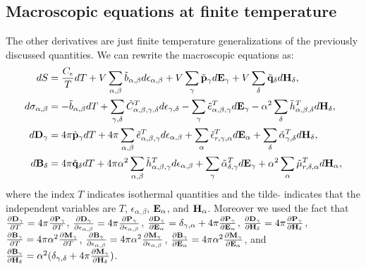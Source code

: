 \documentclass[12pt,a4paper]{article}
\begin{document}
{\subsection{\color{web-blue}Macroscopic equations at finite temperature}
The other derivatives are just finite temperature generalizations of the
previously discussed quantities. We can rewrite the macroscopic equations as:
\begin{align}
dS&= {C_\epsilon\over T} dT+ V \sum_{\alpha,\beta} \tilde b_{\alpha,\beta} 
d\epsilon_{\alpha,\beta}
+ V \sum_\gamma \tilde {\bf p}_\gamma d{\bf E}_{\gamma} + 
V \sum_\delta \tilde {\bf q}_\delta d{\bf H}_{\delta}, \\
d\sigma_{\alpha,\beta}&= -\tilde b_{\alpha,\beta} dT + 
\sum_{\gamma,\delta} \tilde C^T_{\alpha,\beta,\gamma,\delta} 
d \epsilon_{\gamma,\delta} - \sum_\gamma \tilde e^T_{\alpha,\beta,\gamma} 
d{\bf E}_{\gamma} -\alpha^2
\sum_\delta \tilde h^T_{\alpha,\beta,\delta} d{\bf H}_{\delta}, \\
d{\bf D}_\gamma&=
4 \pi \tilde {\bf p}_\gamma dT + 4 \pi \sum_{\alpha,\beta} \tilde 
e^T_{\alpha,\beta,\gamma} d\epsilon_{\alpha,\beta}
+\sum_\alpha \tilde \epsilon^T_{r,\gamma,\alpha} 
d{\bf E}_{\alpha} + 
\sum_\delta \tilde \alpha^T_{\gamma,\delta} d{\bf H}_{\delta}, 
\label{dau} \\
d{\bf B}_\delta&=
4 \pi \tilde {\bf q}_\delta dT+ 4 \pi \alpha^2 \sum_{\alpha,\beta}
\tilde h^T_{\alpha,\beta,\gamma}
d\epsilon_{\alpha,\beta}
+\sum_\gamma \tilde \alpha^T_{\delta,\gamma}
d{\bf E}_{\gamma}+ \alpha^2
\sum_\alpha \tilde \mu^{T}_{r,\delta,\alpha}
d{\bf H}_{\alpha}, \label{bau} 
\end{align}
where the index $T$ indicates isothermal quantities and 
the tilde $\tilde{ }$ indicates that the independent variables are
$T$, $\epsilon_{\alpha,\beta}$, ${\bf E}_\alpha$, and ${\bf H}_\alpha$. 
Moreover we used the fact
that 
${\partial {\bf D}_\gamma \over \partial T} =
4 \pi {\partial {\bf P}_\gamma \over \partial T}$,
${\partial {\bf D}_\gamma \over \partial \epsilon_{\alpha,\beta}}=
4 \pi {\partial {\bf P}_\gamma \over \partial \epsilon_{\alpha,\beta}}$,
${\partial {\bf D}_\gamma \over \partial {\bf E}_{\alpha}}=  
\delta_{\gamma,\alpha} + 4 \pi 
{\partial {\bf P}_\gamma \over \partial {\bf E}_{\alpha}}$, 
${\partial {\bf D}_\gamma \over \partial {\bf H}_{\delta}}= 
4 \pi {\partial {\bf P}_\gamma \over \partial {\bf H}_{\delta}}$, 
${\partial {\bf B}_\gamma \over \partial T} = 4 \pi \alpha^2
{\partial {\bf M}_\gamma \over \partial T}$,
${\partial {\bf B}_\gamma \over \partial \epsilon_{\alpha,\beta}}= 4 \pi 
\alpha^2 {\partial {\bf M}_\gamma \over \partial \epsilon_{\alpha,\beta}}$,
${\partial {\bf B}_\gamma \over \partial {\bf E}_{\alpha}}= 4 \pi \alpha^2
{\partial {\bf M}_\gamma \over \partial {\bf E}_{\alpha}}$, and
${\partial {\bf B}_\gamma \over \partial {\bf H}_{\delta}}= \alpha^2
(\delta_{\gamma,\delta} + 4 \pi
{\partial {\bf M}_\gamma \over \partial {\bf H}_{\delta}})$. 

}
\end{document}
